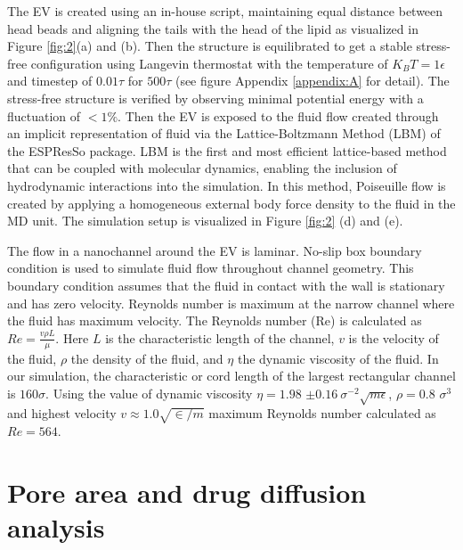 The EV is created using an in-house script, maintaining equal distance between head beads and aligning the tails with the head of the lipid as visualized in Figure \ref{fig:2}(a) and (b). Then the structure is equilibrated to get a stable stress-free configuration using Langevin thermostat with the temperature of $K_BT=1\epsilon$ and timestep of $0.01 \tau$ for  $500\tau$ (see figure Appendix \ref{appendix:A} for detail). The stress-free structure is verified by observing minimal potential energy with a fluctuation of $<1\%$. Then the EV is exposed to the fluid flow created through an implicit representation of fluid via the Lattice-Boltzmann Method (LBM) of the ESPResSo package\cite{a61}. LBM is the first and most efficient lattice-based method that can be coupled with molecular dynamics, enabling the inclusion of hydrodynamic interactions into the simulation. In this method, Poiseuille flow is created by applying a homogeneous external body force density to the fluid in the MD unit. The simulation setup is visualized in Figure \ref{fig:2} (d) and (e).

The flow in a nanochannel around the EV is laminar. No-slip box boundary condition is used to simulate fluid flow throughout channel geometry. This boundary condition assumes that the fluid in contact with the wall is stationary and has zero velocity. Reynolds number is maximum at the narrow channel where the fluid has maximum velocity. The Reynolds number (Re) is calculated as $Re=\frac{v\rho L}{\mu}$. Here $L$ is the characteristic length of the channel, $v$ is the velocity of the fluid, $\rho$ the density of the fluid, and $\eta$ the dynamic viscosity of the fluid. In our simulation, the characteristic or cord length of the largest rectangular channel is $160 \sigma$. Using the value of dynamic viscosity $\eta=1.98$ $\pm 0.16{\ \sigma}^{-2}\sqrt{m\epsilon}$, ${\rho=0.8}$ $\sigma^3$ and highest velocity $v\approx1.0\sqrt{\in/m}$ maximum Reynolds number calculated as $Re = 564$.

\section{Pore area and drug diffusion analysis}\label{subsec: Pore area and drug diffusion analysis}

